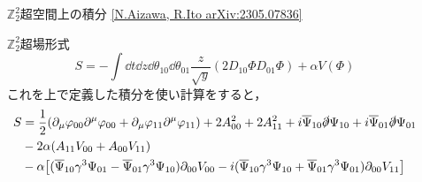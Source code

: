 \documentclass[dvipdfmx]{beamer}
\newcommand{\Z}{\mathbb{Z}}
\newcommand{\Ztt}{\mathbb{Z}_2^2}
\begin{document}
\begin{frame}
\begin{columns}[t]
\begin{column}{0.47\textwidth}


		\end{column}
		\begin{column}{0.47\textwidth}
		\begin{block}{$\Z_2^2$超空間上の積分 \scriptsize{\href{https://arxiv.org/abs/2305.07836}{[N.Aizawa, R.Ito arXiv:2305.07836]}}}
		\end{block}

		\begin{block}{$\Ztt$超場形式}
			\[S = -\int\dd{t}\dd{z}\dd{\theta_{10}}\dd{\theta_{01}}\frac{z}{\sqrt{y}}(2D_{10}\Phi D_{01}\Phi) + \alpha V(\Phi)\]
			これを上で定義した積分を使い計算をすると，
			\begin{align*}
				S &= \frac{1}{2} (\partial_{\mu} \varphi_{00} \partial^{\mu} \varphi_{00} + \partial_{\mu} \varphi_{11} \partial^{\mu} \varphi_{11}) +2 A_{00}^2 + 2 A_{11}^2
	+i \overline{\Psi}_{10}  \slashed{\partial} \Psi_{10} 
	+i \overline{\Psi}_{01}  \slashed{\partial} \Psi_{01}
	\nonumber \\
	&-2\alpha ( A_{11} V_{00} + A_{00} V_{11} )
	\nonumber \\
	& - \alpha \big[ (\overline{\Psi}_{10} \gamma^3 \Psi_{01} - \overline{\Psi}_{01}\gamma^3 \Psi_{10}) \partial_{00} V_{00}
	-i( \overline{\Psi}_{10} \gamma^3 \Psi_{10} + \overline{\Psi}_{01} \gamma^3 \Psi_{01}) \partial_{00} V_{11} \big]
\end{align*}
		\end{block}
		\end{column}
\end{columns}
\end{frame}
\end{document}
